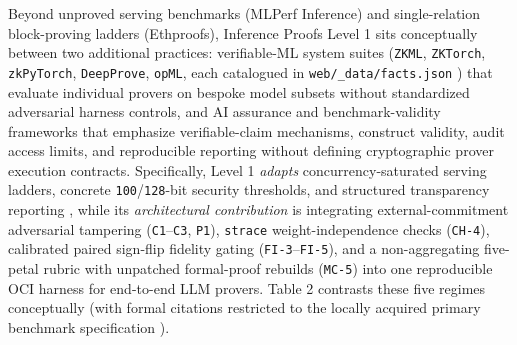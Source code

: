 \documentclass[11pt,letterpaper]{article}
\begin{document}
Beyond unproved serving benchmarks (MLPerf Inference) and single-relation block-proving ladders (Ethproofs), Inference Proofs Level 1 sits conceptually between two additional practices: verifiable-ML system suites (\texttt{ZKML}, \texttt{ZKTorch}, \texttt{zkPyTorch}, \texttt{DeepProve}, \texttt{opML}, each catalogued in \texttt{web/\allowbreak{}\_\allowbreak{}data/\allowbreak{}facts.\allowbreak{}json} \cite{iproofs2026}) that evaluate individual provers on bespoke model subsets without standardized adversarial harness controls, and AI assurance and benchmark-validity frameworks that emphasize verifiable-claim mechanisms, construct validity, audit access limits, and reproducible reporting without defining cryptographic prover execution contracts. Specifically, Level 1 \textit{adapts} concurrency-saturated serving ladders, concrete \texttt{100}/\texttt{128}-bit security thresholds, and structured transparency reporting \cite{iproofs2026}, while its \textit{architectural contribution} is integrating external-commitment adversarial tampering (\texttt{C1}--\texttt{C3}, \texttt{P1}), \texttt{strace} weight-independence checks (\texttt{CH-4}), calibrated paired sign-flip fidelity gating (\texttt{FI-3}--\texttt{FI-5}), and a non-aggregating five-petal rubric with unpatched formal-proof rebuilds (\texttt{MC-5}) into one reproducible OCI harness for end-to-end LLM provers. Table 2 contrasts these five regimes conceptually (with formal citations restricted to the locally acquired primary benchmark specification \cite{iproofs2026}).
\end{document}
